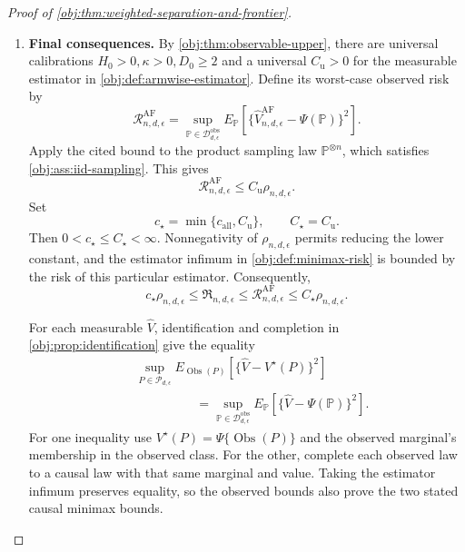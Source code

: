 \documentclass[11pt]{article}
\begin{document}
\begin{proof}[Proof of \cref{obj:thm:weighted-separation-and-frontier}]
\begin{enumerate}
Now define
\[
c_{\mathrm{all}}
=\min\left\{c_{\mathrm{lg}},\frac1{1024D_{\mathrm{lg}}}\right\}>0.
\]
For \(d\ge D_{\mathrm{lg}}\), the large-alphabet bound applies.
For \(2\le d<D_{\mathrm{lg}}\), using \(L_d\ge1\) gives
\[
\rho_{n,d,\epsilon}
\le
D_{\mathrm{lg}}\min\left\{1,\frac1{n\epsilon}\right\}.
\]
Indeed, \(\rho_{n,d,\epsilon}\le1\le D_{\mathrm{lg}}\), and
\[
\rho_{n,d,\epsilon}
\le\frac d{n\epsilon L_d}
\le\frac{D_{\mathrm{lg}}}{n\epsilon}.
\]
Thus in this second case,
\[
c_{\mathrm{all}}\rho_{n,d,\epsilon}
\le
\frac1{1024}\min\left\{1,\frac1{n\epsilon}\right\}
\le\mathfrak R_{n,d,\epsilon}.
\]
Together the two cases establish
\[
c_{\mathrm{all}}\rho_{n,d,\epsilon}
\le\mathfrak R_{n,d,\epsilon}
\qquad(n\ge1,\ d\ge2,\ 0<\epsilon\le1/2).
\]

\item
\textbf{Final consequences.}\quad
By \cref{obj:thm:observable-upper}, there are universal calibrations
\(H_0>0,\kappa>0,D_0\ge2\) and a universal \(C_{\mathrm u}>0\) for the measurable estimator in
\cref{obj:def:armwise-estimator}. Define its worst-case observed risk by
\[
\mathcal R^{\mathrm{AF}}_{n,d,\epsilon}
=
\sup_{\mathbb P\in\mathcal D_{d,\epsilon}^{\mathrm{obs}}}
E_{\mathbb P}
\left[
\{\widehat V_{n,d,\epsilon}^{\mathrm{AF}}-\Psi(\mathbb P)\}^2
\right].
\]
Apply the cited bound to the product sampling law
\(\mathbb P^{\otimes n}\), which satisfies
\cref{obj:ass:iid-sampling}. This gives
\[
\mathcal R^{\mathrm{AF}}_{n,d,\epsilon}
\le C_{\mathrm u}\rho_{n,d,\epsilon}.
\]
Set
\[
c_\star=\min\{c_{\mathrm{all}},C_{\mathrm u}\},
\qquad
C_\star=C_{\mathrm u}.
\]
Then \(0<c_\star\le C_\star<\infty\). Nonnegativity of
\(\rho_{n,d,\epsilon}\) permits reducing the lower constant, and the estimator infimum in
\cref{obj:def:minimax-risk} is bounded by the risk of this particular estimator. Consequently,
\[
c_\star\rho_{n,d,\epsilon}
\le\mathfrak R_{n,d,\epsilon}
\le\mathcal R^{\mathrm{AF}}_{n,d,\epsilon}
\le C_\star\rho_{n,d,\epsilon}.
\]

For each measurable \(\widehat V\), identification and completion in
\cref{obj:prop:identification} give the equality
\[
\begin{aligned}
&\sup_{P\in\mathcal P_{d,\epsilon}}
E_{\operatorname{Obs}(P)}
[\{\widehat V-V^\star(P)\}^2]\\
&\hspace{2cm}=
\sup_{\mathbb P\in\mathcal D_{d,\epsilon}^{\mathrm{obs}}}
E_{\mathbb P}
[\{\widehat V-\Psi(\mathbb P)\}^2].
\end{aligned}
\]
For one inequality use
\(V^\star(P)=\Psi\{\operatorname{Obs}(P)\}\) and the observed marginal's membership in the observed class. For the other, complete each observed law to a causal law with that same marginal and value. Taking the estimator infimum preserves equality, so the observed bounds also prove the two stated causal minimax bounds.


\end{enumerate}
\end{proof}
\end{document}
